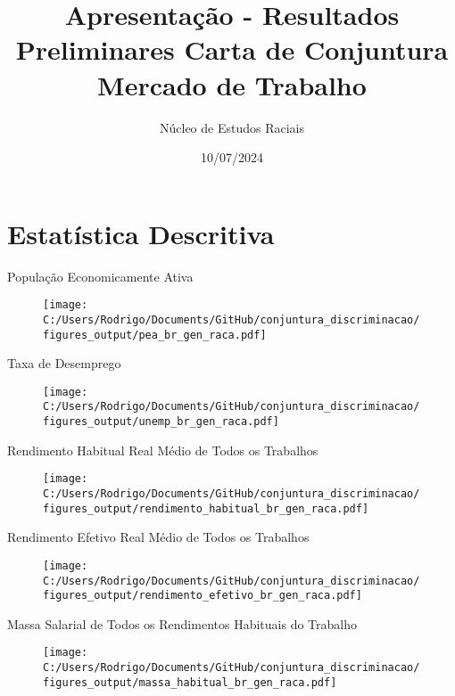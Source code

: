 \documentclass[10pt, xcolor=x11names,compress]{beamer}
\author{Núcleo de Estudos Raciais}
\title{Apresentação - Resultados Preliminares Carta de Conjuntura Mercado de Trabalho}
\institute{Insper}\date{10/07/2024}
\begin{document}
	\begin{frame}
		\titlepage
	\end{frame}

	
	\section{Estatística Descritiva} 
	\begin{frame}{População Economicamente Ativa}
		\begin{figure}
			\centering
			\texttt{[image: C:/Users/Rodrigo/Documents/GitHub/conjuntura\_discriminacao/figures\_output/pea\_br\_gen\_raca.pdf]}
		\end{figure}
	\end{frame}			
	
	
	\begin{frame}{Taxa de Desemprego}
		\begin{figure}
			\centering
			\texttt{[image: C:/Users/Rodrigo/Documents/GitHub/conjuntura\_discriminacao/figures\_output/unemp\_br\_gen\_raca.pdf]}
		\end{figure}
	\end{frame}			
	
	
	\begin{frame}{Rendimento Habitual Real Médio de Todos os Trabalhos}
		\begin{figure}
			\centering
			\texttt{[image: C:/Users/Rodrigo/Documents/GitHub/conjuntura\_discriminacao/figures\_output/rendimento\_habitual\_br\_gen\_raca.pdf]}
		\end{figure}
	\end{frame}
	
	\begin{frame}{Rendimento Efetivo Real Médio de Todos os Trabalhos}
		\begin{figure}
			\centering
			\texttt{[image: C:/Users/Rodrigo/Documents/GitHub/conjuntura\_discriminacao/figures\_output/rendimento\_efetivo\_br\_gen\_raca.pdf]}
		\end{figure}
	\end{frame}
	
	\begin{frame}{Massa Salarial de Todos os Rendimentos Habituais do Trabalho}
		\begin{figure}
			\centering
			\texttt{[image: C:/Users/Rodrigo/Documents/GitHub/conjuntura\_discriminacao/figures\_output/massa\_habitual\_br\_gen\_raca.pdf]}
		\end{figure}
	\end{frame}
	
\end{document}
